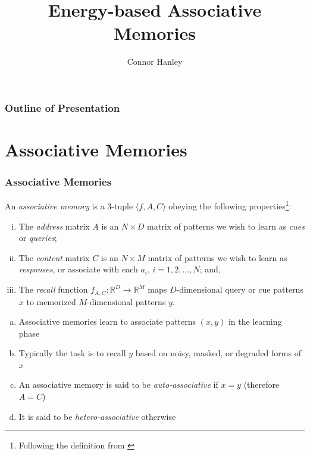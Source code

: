 \documentclass{beamer}
\title{Energy-based Associative Memories}
\author{Connor Hanley}
\begin{document}
\begin{frame}
    \maketitle
\end{frame}

\begin{frame}
    \frametitle{Outline of Presentation}
    \tableofcontents
\end{frame}

\section{Associative Memories}
\begin{frame}
\frametitle{Associative Memories}

\begin{definition}
    An \textit{associative memory} is a $3$-tuple $\langle f, A, C \rangle$
    obeying the following properties\footnote{Following the definition from 
    \parencite{kanerva_sparse_1993}}:
    \begin{enumerate}[(i)]
        \item The \textit{address} matrix $A$ is an $N \times D$ matrix of 
        patterns we wish to learn as \textit{cues} or \textit{queries};\label{def:assoc:cond1}
        \item The \textit{content} matrix $C$ is an $N \times M$ matrix of
        patterns we wish to learn as \textit{responses}, or associate with 
        each $a_i$, $i = 1, 2, \dots, N$; and, \label{def:assoc:cond2}
        \item The \textit{recall} function 
        $f_{A, C} : \mathbb{R}^D \to \mathbb{R}^M$ maps $D$-dimensional query or 
        cue patterns $x$ to memorized $M$-dimensional patterns $y$. \label{def:assoc:cond3}
    \end{enumerate}
\end{definition}\label{def:assoc}

\end{frame}

\begin{frame}
    \begin{enumerate}[(a)]
        \item Associative memories learn to associate patterns $(x, y)$ in the 
        learning phase
        \item Typically the task is to recall $y$ based on noisy, masked, or 
        degraded forms of $x$
        \item An associative memory is said to be \textit{auto-associative} 
        if $x = y$ (therefore $A = C$)
        \item It is said to be \textit{hetero-associative} otherwise
    \end{enumerate}
\end{frame}
\end{document}
